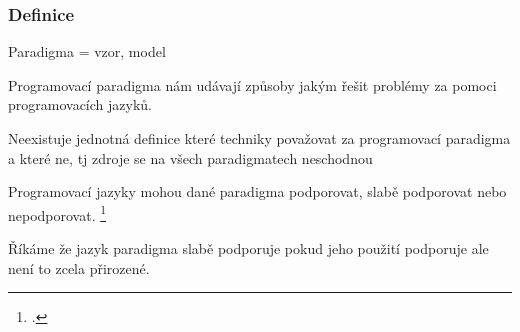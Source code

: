 

\begin{frame}
    \frametitle{Definice}
    Paradigma = vzor, model

    Programovací paradigma nám udávají způsoby jakým řešit problémy za pomoci programovacích jazyků.

    Neexistuje jednotná definice které techniky považovat za programovací paradigma a které ne, tj zdroje se na všech paradigmatech neschodnou

    Programovací jazyky mohou dané paradigma podporovat, slabě podporovat nebo nepodporovat. \footcite{paradigms_of_programming}
    
    Říkáme že jazyk paradigma slabě podporuje pokud jeho použití podporuje ale není to zcela přirozené.
\end{frame}
